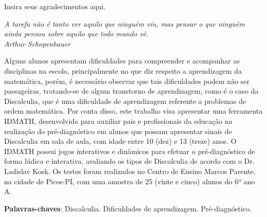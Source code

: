 \documentclass[
	12pt,				%
    oneside,			%
	a4paper,			%
	english,			%
	french,				%
	spanish,			%
	brazil,				%
	]{abntex2}
\begin{document}
\frenchspacing 


\imprimircapa

\imprimirfolhaderosto*






\begin{agradecimentos}
Insira seus agradecimentos aqui.
\end{agradecimentos}

\begin{epigrafe}

\vspace*{\fill}
{ \raggedleft
	\textit{A tarefa não é tanto ver aquilo que ninguém viu, mas pensar o que ninguém ainda pensou sobre aquilo que todo mundo vê. \\
		Arthur Schopenhauer}
	~
}
\pagebreak
\end{epigrafe}


\begin{resumo} %

Alguns alunos apresentam dificuldades para compreender e acompanhar as disciplinas na escola, principalmente no que diz respeito a aprendizagem da matemática, porém, é necessário observar que tais dificuldades podem não ser passageiras, tratando-se de algum transtorno de aprendizagem, como é o caso da Discalculia, que é uma dificuldade de aprendizagem referente a problemas de ordem matemática. Por conta disso, este trabalho visa apresentar uma ferramenta IDMATH, desenvolvida para auxiliar pais e profissionais da educação na realização do pré-diagnóstico em alunos que possam apresentar sinais de Discalculia em sala de aula, com idade entre 10 (dez) e 13 (treze) anos. O IDMATH possui jogos interativos e dinâmicos para efetuar o pré-diagnóstico de forma lúdica e interativa, avaliando os tipos de Discalculia de acordo com o Dr. Ladislav Kosk. Os testes foram realizados no Centro de Ensino Marcos Parente, na cidade de Picos-PI, com uma amostra de 25 (vinte e cinco) alunos do 6º ano A.
 

 \vspace{\onelineskip}
    
 \noindent
 \textbf{Palavras-chaves}: Discalculia. Dificuldades de aprendizagem. Pré-diagnóstico.
\end{resumo} %
\end{document}
